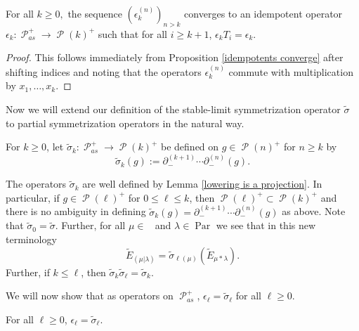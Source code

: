 \documentclass[ALCO,Unicode]{cedram}
\DeclareMathOperator{\sP}{\mathscr{P} }
\DeclareMathOperator{\Par}{\mathrm{Par}}
\DeclareMathOperator{\Compred}{\mathrm{Comp}^{\textit{red}}}
\begin{document}
\begin{coro}\label{partial idempotents converge}
    For all $k \geq 0,$ the sequence $(\epsilon^{(n)}_k)_{n>k}$ converges to an idempotent operator $\epsilon_k: \sP_{as}^{+} \rightarrow \sP(k)^{+}$ such that for all $ i \geq k+1$, $\epsilon_k T_i = \epsilon_k$.
\end{coro}

\begin{proof}
    This follows immediately from Proposition \ref{idempotents converge} after shifting indices and noting that the operators $\epsilon^{(n)}_k$ commute with multiplication by $x_1,\ldots, x_k$.
\end{proof}

Now we will extend our definition of the stable-limit symmetrization operator $\widetilde{\sigma}$ to partial symmetrization operators in the natural way.

\begin{defi}\label{defn 12}
    For $k \geq 0$, let $\widetilde{\sigma}_k: \sP_{as}^{+} \rightarrow \sP(k)^{+}$ be defined on $g \in \sP(n)^{+}$ for $n \geq k$ by 
    \begin{equation}
        \widetilde{\sigma}_k(g):= \partial_{-}^{(k+1)}\cdots \partial_{-}^{(n)}(g).
    \end{equation}
\end{defi}

\begin{rema}
    The operators $\widetilde{\sigma}_k$ are well defined by Lemma \ref{lowering is a projection}. In particular, if $g \in \sP(\ell)^{+}$ for $0 \leq \ell \leq k$, then $\sP(\ell)^{+} \subset \sP(k)^{+}$ and there is no ambiguity in defining $\widetilde{\sigma}_k(g) = \partial_{-}^{(k+1)}\cdots \partial_{-}^{(n)}(g)$ as above. Note that $\widetilde{\sigma}_0 = \widetilde{\sigma}$. Further, for all $\mu \in \Compred$ and $\lambda \in \Par$ we see that in this new terminology 
    $$\widetilde{E}_{(\mu|\lambda)} = \widetilde{\sigma}_{\ell(\mu)}(\widetilde{E}_{\mu*\lambda}). $$ Further, if $k \leq \ell$, then $\widetilde{\sigma}_k\widetilde{\sigma}_{\ell} = \widetilde{\sigma}_k.$
\end{rema}

We will now show that as operators on $\sP_{as}^{+}$, $\epsilon_{\ell} = \widetilde{\sigma}_{\ell}$ for all ${\ell} \geq 0$.

\begin{prop}\label{idempotent = HL}
    For all $\ell \geq 0$, $\epsilon_{\ell} = \widetilde{\sigma}_{\ell} .$
\end{prop}
\end{document}
